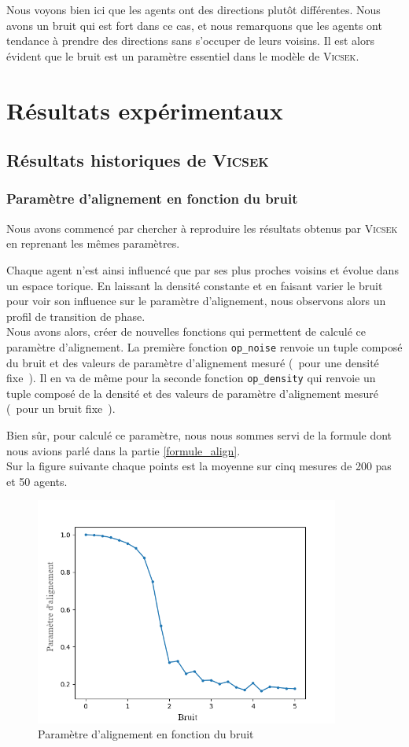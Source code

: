 \documentclass[french, a4paper, 12pt, openany]{report}
\begin{document}
	
Nous voyons bien ici que les agents ont des directions plutôt différentes. Nous avons un bruit qui est fort dans ce cas, et nous remarquons que les agents ont tendance à prendre des directions sans s'occuper de leurs voisins. Il est alors évident que le bruit est un paramètre essentiel dans le modèle de \textsc{Vicsek}.
   
\chapter{Résultats expérimentaux} \label{chap:resultats}
\section{Résultats historiques de \textsc{Vicsek}}
\subsection{Paramètre d'alignement en fonction du bruit} 
	Nous avons commencé par chercher à reproduire les résultats obtenus par \textsc{Vicsek} en reprenant les mêmes paramètres.
	
	Chaque agent n'est ainsi influencé que par ses plus proches voisins et évolue dans un espace torique. En laissant la densité constante et en faisant varier le bruit pour voir son influence sur le paramètre d'alignement, nous observons alors un profil de transition de phase.\\
	
	Nous avons alors, créer de nouvelles fonctions qui permettent de calculé ce paramètre d'alignement. La première fonction \verb|op_noise| renvoie un tuple composé du bruit et des valeurs de paramètre d'alignement mesuré (~pour une densité fixe~). Il en va de même pour la seconde fonction \verb|op_density| qui renvoie un tuple composé de la densité et des valeurs de paramètre d'alignement mesuré (~pour un bruit fixe~).
	
	Bien sûr, pour calculé ce paramètre, nous nous sommes servi de la formule dont nous avions parlé dans la partie \ref{formule_align}.\\
	
	Sur la figure suivante chaque points est la moyenne sur cinq mesures de 200 pas et 50 agents.
	\begin{figure}[!h]
		\centering
		\includegraphics[width=10cm]{images/bruit_4bis.png}
		\caption{Paramètre d'alignement en fonction du bruit}
		\label{param_bruit}
	\end{figure}
	
\end{document}
